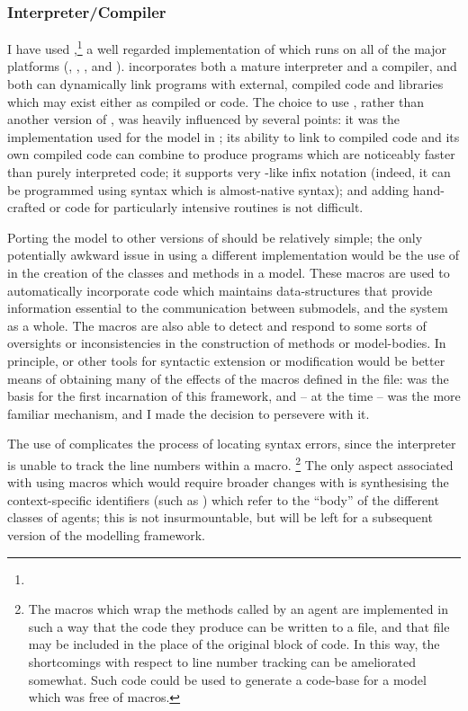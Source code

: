 \subsubsection{Interpreter/Compiler}
I have used
\GambitC,\footnote{} a well
regarded implementation of \Scheme which runs on all of the major
platforms (\Linux, \Unix, \OSX, \Android and \Windows). \Gambit
incorporates both a mature \Scheme interpreter and a compiler, and
both can dynamically link programs with external, compiled code and
libraries which may exist either as compiled \CC or \Scheme code.  The
choice to use \Gambit, rather than another version of \Scheme, was
heavily influenced by several points: it was the implementation used
for the model in \Ctwo; its ability to link to compiled \CC code and
its own compiled code can combine to produce programs which are
noticeably faster than purely interpreted code; it supports
very \CC-like infix notation (indeed, it can be programmed using
syntax which is almost-native \CC syntax); and adding hand-crafted \CC
or \Cpp code for particularly intensive routines is not difficult.

Porting the model to other versions of \Scheme should be relatively
simple; the only potentially awkward issue in using a
different \Scheme implementation would be the use of \sdefmac in the
creation of the classes and methods in a model.  These macros are used
to automatically incorporate code which maintains data-structures that
provide information essential to the communication between submodels,
and the system as a whole. The macros are also able to detect and
respond to some sorts of oversights or inconsistencies in the
construction of methods or model-bodies.  In principle, \sdefsyntax or
other tools for syntactic extension or modification would be better
means of obtaining many of the effects of the macros defined in the
 file: \sdefmac was the basis for the first
incarnation of this framework, and -- at the time -- was the more
familiar mechanism, and I made the decision to persevere with it.

The use of \sdefmac complicates the process of locating syntax errors,
since the interpreter is unable to track the line numbers within a
macro. \footnote{The macros which wrap the methods called by an agent
are implemented in such a way that the code they produce can be
written to a file, and that file may be included in the place of the
original block of code.  In this way, the shortcomings with respect to
line number tracking can be ameliorated somewhat.  Such code could be
used to generate a code-base for a model which was free of macros.}
The only aspect associated with using macros which would require
broader changes with \sdefsyntax is synthesising the context-specific
identifiers (such as
) which refer to the ``body'' of the
different classes of agents; this is not insurmountable, but will be
left for a subsequent version of the modelling framework.

